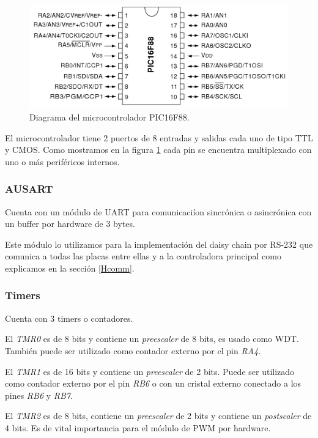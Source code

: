 \begin{figure}[ht]
	\centering
	\includegraphics[scale=0.20]{pic16f88.png}
	\caption{Diagrama del microcontrolador PIC16F88.}
	\label{HFpic16f88}
\end{figure}

El microcontrolador tiene 2 puertos de 8 entradas y salidas cada uno de tipo TTL y CMOS.
Como mostramos en la figura \ref{HFpic16f88} cada pin se encuentra multiplexado con uno o m\'as perif\'ericos internos.

\subsubsection{AUSART}
\label{HMrs232}

Cuenta con un m\'odulo de UART para comunicaci\'ion sincr\'onica o asincr\'onica con un buffer por hardware de 3 bytes.

Este m\'odulo lo utilizamos para la implementaci\'on del daisy chain por RS-232 que comunica a todas las placas entre
ellas y a la controladora principal como explicamos en la secci\'on \ref{Hcomm}.

\subsubsection{Timers}
\label{timers}

Cuenta con 3 timers o contadores.

El \emph{TMR0} es de 8 bits y contiene un \emph{preescaler} de 8 bits, es usado como WDT.
Tambi\'en puede ser utilizado como contador externo por el pin \emph{RA4}.

El \emph{TMR1} es de 16 bits y contiene un \emph{preescaler} de 2 bits.
Puede ser utilizado como contador externo por el pin \emph{RB6} o con un cristal externo conectado a los pines \emph{RB6} y \emph{RB7}.

El \emph{TMR2} es de 8 bits, contiene un \emph{preescaler} de 2 bits y contiene un \emph{postscaler} de 4 bits.
Es de vital importancia para el m\'odulo de PWM por hardware.

